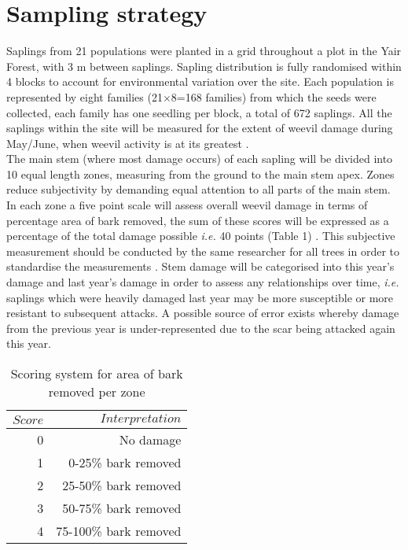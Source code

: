 \documentclass[a4paper,12pt,]{article}
\begin{document}
\section*{\large{Sampling strategy}}
Saplings from 21 populations were planted in a grid throughout a plot in the Yair Forest, with 3 m between saplings. Sapling distribution is fully randomised within 4 blocks to account for environmental variation over the site. Each population is represented by eight families (21$\times$8=168 families) from which the seeds were collected, each family has one seedling per block, a total of 672 saplings. All the saplings within the site will be measured for the extent of  weevil damage during May/June, when weevil activity is at its greatest \citep{Wainhouse2007}.
\\[0.3cm]
The main stem (where most damage occurs) of each sapling will be divided into 10 equal length zones, measuring from the ground to the main stem apex. Zones reduce subjectivity by demanding equal attention to all parts of the main stem. In each zone a five point scale will assess overall weevil damage in terms of percentage area of bark removed, the sum of these scores will be expressed as a percentage of the total damage possible \textit{i.e.} 40 points (Table 1) \citep{Zas2005}. This subjective measurement should be conducted by the same researcher for all trees in order to standardise the measurements . Stem damage will be categorised into this year's damage and last year's damage in order to assess any relationships over time, \textit{i.e.} saplings which were heavily damaged last year may be more susceptible or more resistant to subsequent attacks. A possible source of error exists whereby damage from the previous year is under-represented due to the scar being attacked again this year.
\\[0.3cm]

\begin{table}[h]
\caption{Scoring system for area of bark removed per zone}
\centering
\begin{tabular}{|r|r|}
\hline
$Score$&$Interpretation$\\
\hline
0&No damage\\
1& 0-25\% bark removed\\
2& 25-50\% bark removed\\
3& 50-75\% bark removed\\
4& 75-100\% bark removed\\
\hline
\end{tabular}
\end{table}
\end{document}
